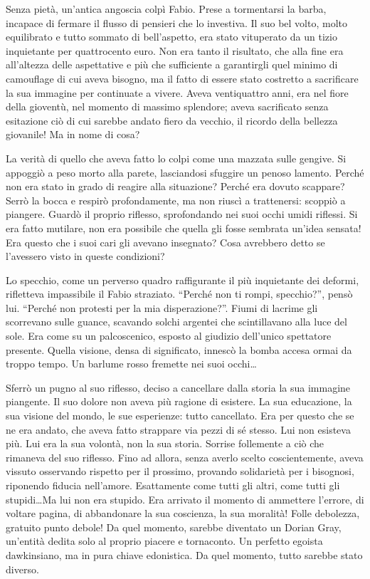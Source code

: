 Senza pietà, un'antica angoscia colpì Fabio. Prese a tormentarsi la barba, incapace di fermare il flusso di pensieri che lo investiva. Il suo bel volto, molto equilibrato e tutto sommato di bell'aspetto, era stato vituperato da un tizio inquietante per quattrocento euro. Non era tanto il risultato, che alla fine era all'altezza delle aspettative e più che sufficiente a garantirgli quel minimo di camouflage di cui aveva bisogno, ma il fatto di essere stato costretto a sacrificare la sua immagine per continuate a vivere. Aveva ventiquattro anni, era nel fiore della gioventù, nel momento di massimo splendore; aveva sacrificato senza esitazione ciò di cui sarebbe andato fiero da vecchio, il ricordo della bellezza giovanile! Ma in nome di cosa?

La verità di quello che aveva fatto lo colpi come una mazzata sulle gengive. Si appoggiò a peso morto alla parete, lasciandosi sfuggire un penoso lamento. Perché non era stato in grado di reagire alla situazione? Perché era dovuto scappare? Serrò la bocca e respirò profondamente, ma non riuscì a trattenersi: scoppiò a piangere. Guardò il proprio riflesso, sprofondando nei suoi occhi umidi riflessi. Si era fatto mutilare, non era possibile che quella gli fosse sembrata un'idea sensata! Era questo che i suoi cari gli avevano insegnato? Cosa avrebbero detto se l'avessero visto in queste condizioni?

Lo specchio, come un perverso quadro raffigurante il più inquietante dei deformi, rifletteva impassibile il Fabio straziato. ``Perché non ti rompi, specchio?'', pensò lui. ``Perché non protesti per la mia disperazione?''. Fiumi di lacrime gli scorrevano sulle guance, scavando solchi argentei che scintillavano alla luce del sole. Era come su un palcoscenico, esposto al giudizio dell'unico spettatore presente. Quella visione, densa di significato, innescò la bomba accesa ormai da troppo tempo. Un barlume rosso fremette nei suoi occhi\ldots

Sferrò un pugno al suo riflesso, deciso a cancellare dalla storia la sua immagine piangente. Il suo dolore non aveva più ragione di esistere. La sua educazione, la sua visione del mondo, le sue esperienze: tutto cancellato. Era per questo che se ne era andato, che aveva fatto strappare via pezzi di sé stesso. Lui non esisteva più. Lui era la sua volontà, non la sua storia. Sorrise follemente a ciò che rimaneva del suo riflesso. Fino ad allora, senza averlo scelto coscientemente, aveva vissuto osservando rispetto per il prossimo, provando solidarietà per i bisognosi, riponendo fiducia nell'amore. Esattamente come tutti gli altri, come tutti gli stupidi\ldots Ma lui non era stupido. Era arrivato il momento di ammettere l'errore, di voltare pagina, di abbandonare la sua coscienza, la sua moralità! Folle debolezza, gratuito punto debole! Da quel momento, sarebbe diventato un Dorian Gray, un'entità dedita solo al proprio piacere e tornaconto. Un perfetto egoista dawkinsiano, ma in pura chiave edonistica. Da quel momento, tutto sarebbe stato diverso.

